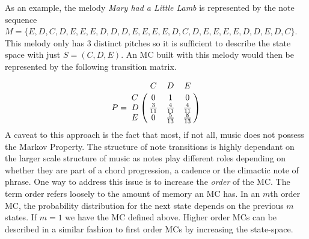 \documentclass[master.tex]{subfiles}
\begin{document}
As an example, the melody \emph{Mary had a Little Lamb} is represented by the note sequence $M = \{ E, D, C, D, E, E, E, D, D, D, E, E, E, E, D, C, D, E, E, E, E, D, D, E, D, C\}$. This melody only has 3 distinct pitches so it is sufficient to describe the state space with just $S = (C, D, E)$. An MC built with this melody would then be represented by the following transition matrix. 

\begin{equation}
P = \bordermatrix{~ & C & D & E \cr
				C & 0 & 1 & 0 \cr
				D & \frac{3}{11} & \frac{4}{11} & \frac{4}{11} \cr
				E & 0 & \frac{5}{13} & \frac{8}{13} \cr}
\end{equation}
A caveat to this approach is the fact that most, if not all, music does not possess the Markov Property. The structure of note transitions is highly dependant on the larger scale structure of music as notes play different roles depending on whether they are part of a chord progression, a cadence or the climactic note of phrase. One way to address this issue is to increase the \emph{order} of the MC. The term order refers loosely to the amount of memory an MC has. In an $m$th order MC, the probability distribution for the next state depends on the previous $m$ states. If $m = 1$ we have the MC defined above. Higher order MCs can be described in a similar fashion to first order MCs by increasing the state-space.
\end{document}
